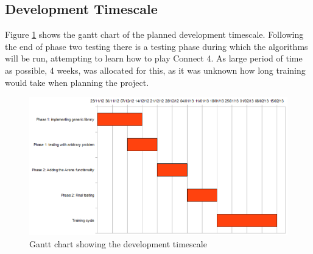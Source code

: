 \subsection{Development Timescale}
Figure \ref{fig:gantt} shows the gantt chart of the planned development timescale. Following the end of phase two testing there is a testing phase during which the algorithms will be run, attempting to learn how to play Connect 4. As large period of time as possible, 4 weeks, was allocated for this, as it was unknown how long training would take when planning the project.
\begin{figure}[tp]
   \begin{center}
     \includegraphics{Figures/gantt}
   \end{center}
   \caption{Gantt chart showing the development timescale}
   \label{fig:gantt}
\end{figure}